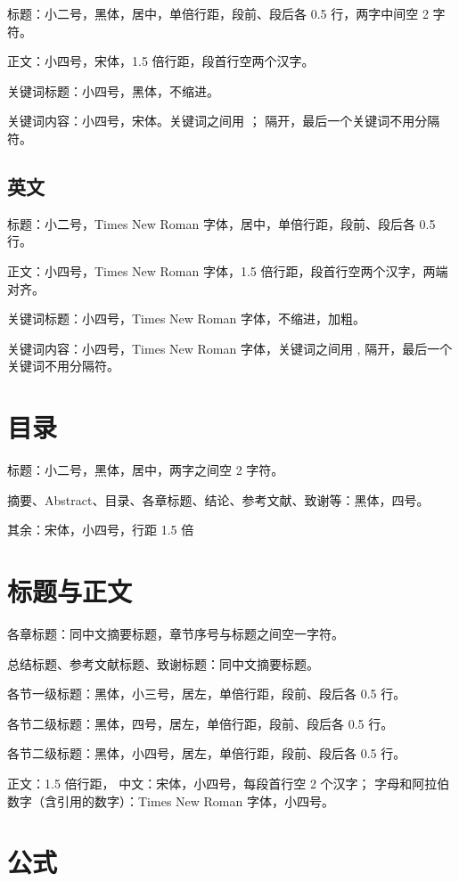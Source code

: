 标题：小二号，黑体，居中，单倍行距，段前、段后各 0.5 行，两字中间空 2 字符。

正文：小四号，宋体，1.5 倍行距，段首行空两个汉字。

关键词标题：小四号，黑体，不缩进。

关键词内容：小四号，宋体。关键词之间用 ； 隔开，最后一个关键词不用分隔符。

\subsection{英文}

标题：小二号，Times New Roman 字体，居中，单倍行距，段前、段后各 0.5 行。

正文：小四号，Times New Roman 字体，1.5 倍行距，段首行空两个汉字，两端对齐。

关键词标题：小四号，Times New Roman 字体，不缩进，加粗。

关键词内容：小四号，Times New Roman 字体，关键词之间用 , 隔开，最后一个关键词不用分隔符。

\section{目录}

标题：小二号，黑体，居中，两字之间空 2 字符。

摘要、Abstract、目录、各章标题、结论、参考文献、致谢等：黑体，四号。

其余：宋体，小四号，行距 1.5 倍

\section{标题与正文}

各章标题：同中文摘要标题，章节序号与标题之间空一字符。

总结标题、参考文献标题、致谢标题：同中文摘要标题。

各节一级标题：黑体，小三号，居左，单倍行距，段前、段后各 0.5 行。

各节二级标题：黑体，四号，居左，单倍行距，段前、段后各 0.5 行。

各节二级标题：黑体，小四号，居左，单倍行距，段前、段后各 0.5 行。

正文：1.5 倍行距，
中文：宋体，小四号，每段首行空 2 个汉字；
字母和阿拉伯数字（含引用的数字）：Times New Roman 字体，小四号。

\section{公式}

